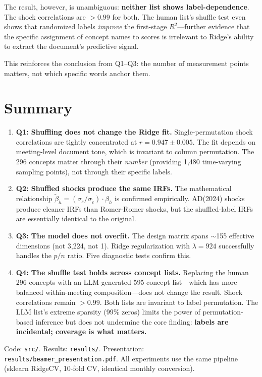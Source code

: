 \documentclass[11pt,a4paper]{article}
\begin{document}
The result, however, is unambiguous: \textbf{neither list shows label-dependence}. The shock correlations are $>0.99$ for both. The human list's shuffle test even shows that randomized labels \textit{improve} the first-stage $R^2$---further evidence that the specific assignment of concept names to scores is irrelevant to Ridge's ability to extract the document's predictive signal.

This reinforces the conclusion from Q1--Q3: the number of measurement points matters, not which specific words anchor them.

\section*{Summary}

\begin{enumerate}
    \item \textbf{Q1: Shuffling does not change the Ridge fit.} Single-permutation shock correlations are tightly concentrated at $r = 0.947 \pm 0.005$. The fit depends on meeting-level document tone, which is invariant to column permutation. The 296 concepts matter through their \textit{number} (providing 1,480 time-varying sampling points), not through their specific labels.

    \item \textbf{Q2: Shuffled shocks produce the same IRFs.} The mathematical relationship $\tilde{\beta}_h = (\sigma_\varepsilon/\sigma_{\tilde{\varepsilon}}) \cdot \beta_h$ is confirmed empirically. AD(2024) shocks produce cleaner IRFs than Romer-Romer shocks, but the shuffled-label IRFs are essentially identical to the original.

    \item \textbf{Q3: The model does not overfit.} The design matrix spans $\sim$155 effective dimensions (not 3,224, not 1). Ridge regularization with $\lambda = 924$ successfully handles the $p/n$ ratio. Five diagnostic tests confirm this.

    \item \textbf{Q4: The shuffle test holds across concept lists.} Replacing the human 296 concepts with an LLM-generated 595-concept list---which has more balanced within-meeting composition---does not change the result. Shock correlations remain $>0.99$. Both lists are invariant to label permutation. The LLM list's extreme sparsity (99\% zeros) limits the power of permutation-based inference but does not undermine the core finding: \textbf{labels are incidental; coverage is what matters.}
\end{enumerate}

\vspace{10pt}
{\small\color{gray} Code: \texttt{src/}. Results: \texttt{results/}. Presentation: \texttt{results/beamer\_presentation.pdf}. All experiments use the same pipeline (sklearn RidgeCV, 10-fold CV, identical monthly conversion).}
\end{document}
